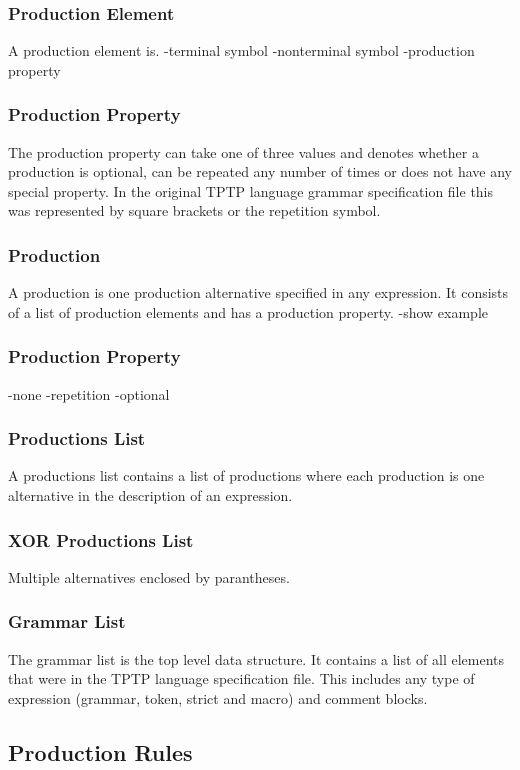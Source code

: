 \subsubsection{Production Element}
A production element is.
-terminal symbol
-nonterminal symbol
-production property
\subsubsection{Production Property}
The production property can take one of three values and denotes whether a production is optional, can be repeated any number of times or does not have any special property. In the original \ac{TPTP} language grammar specification file this was represented by square brackets or the repetition symbol.


\subsubsection{Production}
A production is one production alternative specified in any expression. It consists of a list of production elements and has a production property.
-show example
\subsubsection{Production Property}
-none
-repetition
-optional
\subsubsection{Productions List}
A productions list contains a list of productions where each production is one alternative in the description of an expression.
\subsubsection{XOR Productions List}
Multiple alternatives enclosed by parantheses.

\subsubsection{Grammar List}
The grammar list is the top level data structure. It contains a list of all elements that were in the \ac{TPTP} language specification file. This includes any type of expression (grammar, token, strict and macro) and comment blocks.

\subsection{Production Rules}



